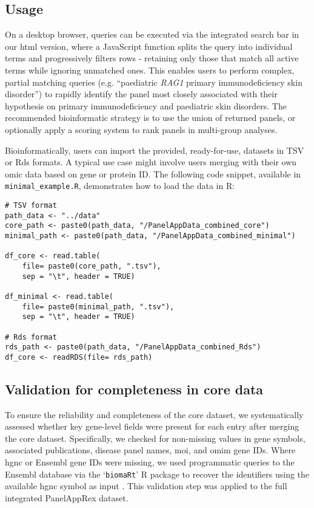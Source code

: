 \subsection{Usage}
\noindent
On a desktop browser, queries can be executed via the integrated search bar in our \ac{html} version, where a JavaScript function splits the query into individual terms and progressively filters rows - retaining only those that match all active terms while ignoring unmatched ones. This enables users to perform complex, partial matching queries (e.g. ``paediatric \textit{RAG1} primary immunodeficiency skin disorder'') to rapidly identify the panel most closely associated with their hypothesis on primary immunodeficiency and paediatric skin disorders.
The recommended bioinformatic strategy is to use the union of returned panels, or optionally apply a scoring system to rank panels in multi-group analyses.

Bioinformatically, users can import the provided, ready-for-use, datasets in TSV or Rds formats. 
A typical use case might involve users merging with their own omic data based on gene or protein ID.
The following code snippet, available in \texttt{minimal\_example.R}, demonstrates how to load the data in R:
\begin{verbatim}
# TSV format
path_data <- "../data"
core_path <- paste0(path_data, "/PanelAppData_combined_core")
minimal_path <- paste0(path_data, "/PanelAppData_combined_minimal")

df_core <- read.table(
    file= paste0(core_path, ".tsv"), 
    sep = "\t", header = TRUE)

df_minimal <- read.table(
    file= paste0(minimal_path, ".tsv"), 
    sep = "\t", header = TRUE)

# Rds format
rds_path <- paste0(path_data, "/PanelAppData_combined_Rds")
df_core <- readRDS(file= rds_path)
\end{verbatim}

\subsection{Validation for completeness in core data}
\noindent
To ensure the reliability and completeness of the core dataset, we systematically assessed whether key gene-level fields were present for each entry after merging the core dataset.
Specifically, we checked for non-missing values in gene symbols, associated publications, disease panel names, \ac{moi}, and \ac{omim} gene IDs. 
Where \ac{hgnc} or Ensembl gene IDs were missing, we used programmatic queries to the Ensembl database via the `\texttt{biomaRt}' R package to recover the identifiers using the available \ac{hgnc} symbol as input \cite{steffen_durinck_biomart}. 
This validation step was applied to the full integrated PanelAppRex dataset.

